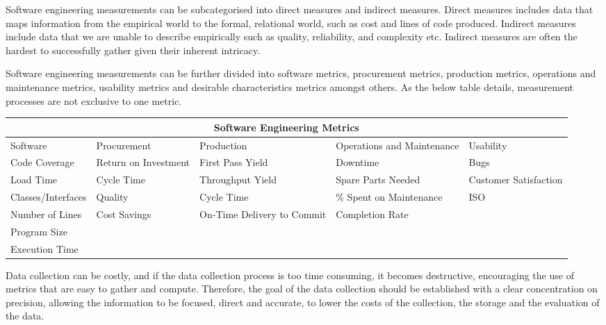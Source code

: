 \documentclass{article}
\begin{document}
Software engineering measurements can be subcategorised into direct measures and indirect measures. Direct measures includes data that maps information from the empirical world to the formal, relational world\cite{direct}, such as cost and lines of code produced. Indirect measures include data that we are unable to describe empirically such as quality, reliability, and complexity etc. Indirect measures are often the hardest to successfully gather given their inherent intricacy. \newline

Software engineering measurements can be further divided into software metrics, procurement metrics, production metrics, operations and maintenance metrics, usability metrics and desirable characteristics metrics amongst others. As the below table details, measurement processes are not exclusive to one metric. \newline

\hspace*{-2cm}\begin{tabular}{ |p{2.5cm}||p{2.5cm}|p{2.5cm}|p{2.5cm}|p{2.5cm}| }
\hline
\multicolumn{5}{|c|}{Software Engineering Metrics} \\
\hline
Software & Procurement & Production & Operations and Maintenance & Usability \\
\hline
Code Coverage & Return on Investment \newline & First Pass Yield & Downtime & Bugs \newline \\
Load Time & Cycle Time & Throughput Yield \newline & Spare Parts Needed \newline & Customer Satisfaction \\
Classes/Interfaces & Quality & Cycle Time & \% Spent on Maintenance \newline & ISO \\
Number of Lines & Cost Savings & On-Time Delivery to Commit & Completion Rate & \\
Program Size & & & & \\
Execution Time & & & & \\
\hline
\end{tabular} \newline \newline

Data collection can be costly, and if the data collection process is too time consuming, it becomes destructive, encouraging the use of metrics that are easy to gather and compute. Therefore, the goal of the data collection should be established with a clear concentration on precision, allowing the information to be focused, direct and accurate, to lower the costs of the collection, the storage and the evaluation of the data. 
\end{document}
